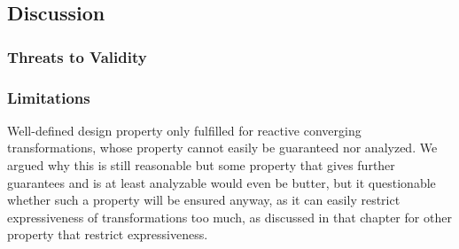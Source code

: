 \subsection{Discussion}


\subsubsection{Threats to Validity}


\subsubsection{Limitations}
Well-defined design property only fulfilled for reactive converging transformations, whose property cannot easily be guaranteed nor analyzed.
We argued why this is still reasonable but some property that gives further guarantees and is at least analyzable would even be butter, but it questionable whether such a property will be ensured anyway, as it can easily restrict expressiveness of transformations too much, as discussed in that chapter for other property that restrict expressiveness.
